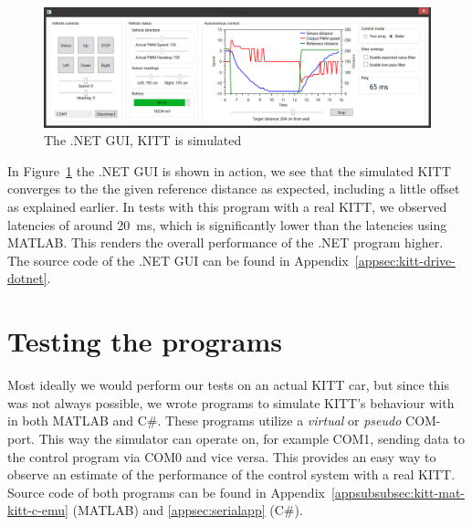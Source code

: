 \documentclass[11pt,titlepage]{report}
\begin{document}
\begin{figure}[H]
	\centering
	\includegraphics[width=\linewidth]{resource/gui-dotnet.png}
	\caption{The .NET GUI, KITT is simulated}
	\label{fig:int-gui-dotnet}
\end{figure}

In Figure~\ref{fig:int-gui-dotnet} the .NET GUI is shown in action, we see that the simulated KITT converges to the the given reference distance as expected, including a little offset as explained earlier. In tests with this program with a real KITT, we observed latencies of around \SI{20}{ms}, which is significantly lower than the latencies using MATLAB. This renders the overall performance of the .NET program higher.
\\
The source code of the .NET GUI can be found in Appendix~\ref{appsec:kitt-drive-dotnet}.

\section{Testing the programs}
Most ideally we would perform our tests on an actual KITT car, but since this was not always possible, we wrote programs to simulate KITT's behaviour with in both MATLAB and C\#. These programs utilize a \textit{virtual} or \textit{pseudo} COM-port. This way the simulator can operate on, for example COM1, sending data to the control program via COM0 and vice versa. This provides an easy way to observe an estimate of the performance of the control system with a real KITT.
\\
Source code of both programs can be found in Appendix~\ref{appsubsubsec:kitt-mat-kitt-c-emu} (MATLAB) and \ref{appsec:serialapp} (C\#).
\end{document}
